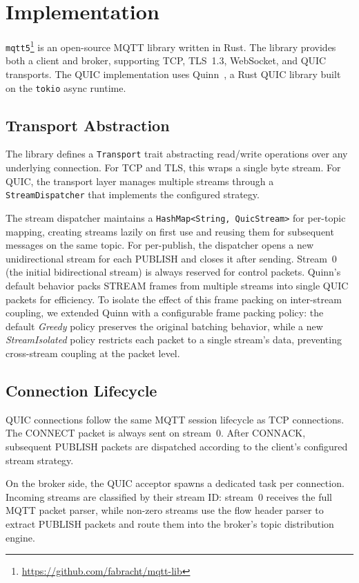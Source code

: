 \section{Implementation}
\label{sec:implementation}

\texttt{mqtt5}\footnote{\url{https://github.com/fabracht/mqtt-lib}} is an open-source MQTT library written in Rust. The library provides both a client and broker, supporting TCP, TLS~1.3, WebSocket, and QUIC transports. The QUIC implementation uses Quinn~\cite{quinn}, a Rust QUIC library built on the \texttt{tokio} async runtime.

\subsection{Transport Abstraction}

The library defines a \texttt{Transport} trait abstracting read/write operations over any underlying connection. For TCP and TLS, this wraps a single byte stream. For QUIC, the transport layer manages multiple streams through a \texttt{StreamDispatcher} that implements the configured strategy.

The stream dispatcher maintains a \texttt{HashMap<String, QuicStream>} for per-topic mapping, creating streams lazily on first use and reusing them for subsequent messages on the same topic. For per-publish, the dispatcher opens a new unidirectional stream for each PUBLISH and closes it after sending. Stream~0 (the initial bidirectional stream) is always reserved for control packets. Quinn's default behavior packs STREAM frames from multiple streams into single QUIC packets for efficiency. To isolate the effect of this frame packing on inter-stream coupling, we extended Quinn with a configurable frame packing policy: the default \emph{Greedy} policy preserves the original batching behavior, while a new \emph{StreamIsolated} policy restricts each packet to a single stream's data, preventing cross-stream coupling at the packet level.

\subsection{Connection Lifecycle}

QUIC connections follow the same MQTT session lifecycle as TCP connections. The CONNECT packet is always sent on stream~0. After CONNACK, subsequent PUBLISH packets are dispatched according to the client's configured stream strategy.

On the broker side, the QUIC acceptor spawns a dedicated task per connection. Incoming streams are classified by their stream ID: stream~0 receives the full MQTT packet parser, while non-zero streams use the flow header parser to extract PUBLISH packets and route them into the broker's topic distribution engine.

